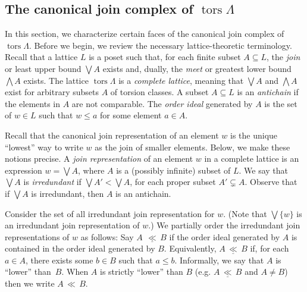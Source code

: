 \documentclass[10pt]{amsart}
\providecommand{\1}{}
\DeclareMathOperator{\tors}{tors}
\renewcommand{\Join}{\bigvee}
\newcommand{\Meet}{\bigwedge}
\newcommand{\strictrefines}{{\,{\ll}\,}}
\newcommand{\refines}{\underline{\,{\ll}\,}}
\renewcommand{\1}{\hat{1}}
\newcommand{\0}{\hat{0}}
\newcommand{\newword}[1]{\emph{#1}}
\theoremstyle{definition}
\begin{document}
\subsection{The canonical join complex of \texorpdfstring{$\tors \Lambda$}{tors Lambda}}\label{canonical join complex}
In this section, we characterize certain faces of the canonical join complex of $\tors \Lambda$.
Before we begin, we review the necessary lattice-theoretic terminology.
Recall that a lattice $L$ is a poset such that, for each finite subset $A\subseteq L$, the \newword{join} or least upper bound $\Join A$ exists and, dually, the \newword{meet} or greatest lower bound $\Meet A$ exists.
The lattice $\tors \Lambda$ is a \newword{complete lattice}, meaning that $\Join A$ and $\Meet A$ exist for arbitrary subsets $A$ of torsion classes.
A subset $A\subseteq L$ is an \newword{antichain} if the elements in $A$ are not comparable.
The \newword{order ideal} generated by $A$ is the set of $w\in L$ such that $w\le a$ for some element $a\in A$.

Recall that the canonical join representation of an element $w$ is the unique ``lowest'' way to write $w$ as the join of smaller elements.
Below, we make these notions precise.
A \newword{join representation} of an element $w$ in a complete lattice is an expression $w=\Join A$, where $A$ is a (possibly infinite) subset of $L$.
We say that $\Join A$ is \newword{irredundant} if $\Join A' < \Join A$, for each proper subset $A'\subsetneq A$.
Observe that if $\Join A$ is irredundant, then $A$ is an antichain.

Consider the set of all irredundant join representation for $w$.
(Note that $\Join \{w\}$ is an irredundant join representation of $w$.)
We partially order the irredundant join representations of $w$ as follows:
Say $A~\refines B$ if the order ideal generated by $A$ is contained in the order ideal generated by $B$.
Equivalently, $A\refines B$ if, for each $a\in A$, there exists some $b\in B$ such that $a\le b$.
Informally, we say that $A$ is ``lower'' than~$B$.
When $A$ is strictly ``lower'' than $B$ (e.g. $A\refines B$ and $A\ne B$) then we write $A\strictrefines B$.
\end{document}
